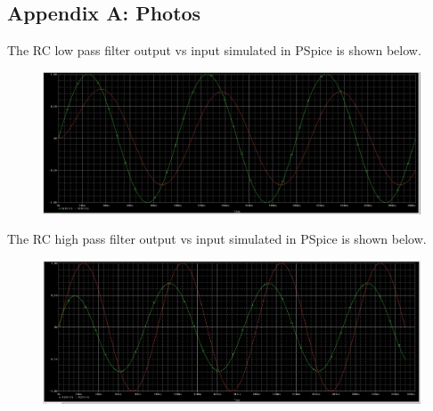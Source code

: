 \documentclass[11pt]{article}
\begin{document}
	\subsection*{Appendix A: Photos}
	The RC low pass filter output vs input simulated in PSpice is shown below. 
	\begin{figure}[H]
		\centering
		\includegraphics[width=5in]{images/PSpice RC Low Pass.PNG}
	\end{figure}
	The RC high pass filter output vs input simulated in PSpice is shown below.
	\begin{figure}[H]
		\centering
		\includegraphics[width=5in]{images/RC High Pass.PNG}
	\end{figure}
	
\end{document}
